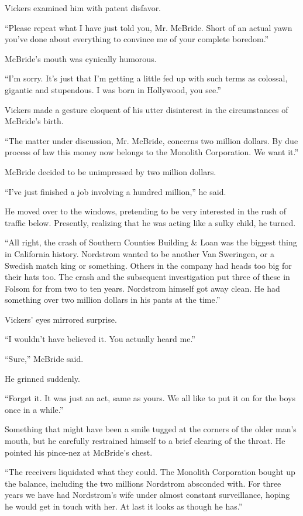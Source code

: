 \documentclass{novel}
\begin{document}
Vickers examined him with patent disfavor.

\null

“Please repeat what I have just told you, Mr. McBride. Short of an actual yawn you’ve done about everything to convince me of your complete boredom.”

McBride’s mouth was cynically humorous.

“I’m sorry. It’s just that I’m getting a little fed up with such terms as colossal, gigantic and stupendous. I was born in Hollywood, you see.”

Vickers made a gesture eloquent of his utter disinterest in the circumstances of McBride’s birth.

“The matter under discussion, Mr. McBride, concerns two million dollars. By due process of law this money now belongs to the Monolith Corporation. We want it.”

McBride decided to be unimpressed by two million dollars.

“I’ve just finished a job involving a hundred million,” he said.

He moved over to the windows, pretending to be very interested in the rush of traffic below. Presently, realizing that he was acting like a sulky child, he turned.

“All right, the crash of Southern Counties Building \& Loan was the biggest thing in California history. Nordstrom wanted to be another Van Sweringen, or a Swedish match king or something. Others in the company had heads too big for their hats too. The crash and the subsequent investigation put three of these in Folsom for from two to ten years. Nordstrom himself got away clean. He had something over two million dollars in his pants at the time.”

Vickers’ eyes mirrored surprise.

“I wouldn’t have believed it. You actually heard me.”

“Sure,” McBride said.

He grinned suddenly.

“Forget it. It was just an act, same as yours. We all like to put it on for the boys once in a while.”

Something that might have been a smile tugged at the corners of the older man’s mouth, but he carefully restrained himself to a brief clearing of the throat. He pointed his pince-nez at McBride’s chest.

“The receivers liquidated what they could. The Monolith Corporation bought up the balance, including the two millions Nordstrom absconded with. For three years we have had Nordstrom’s wife under almost constant surveillance, hoping he would get in touch with her. At last it looks as though he has.”
\end{document}
